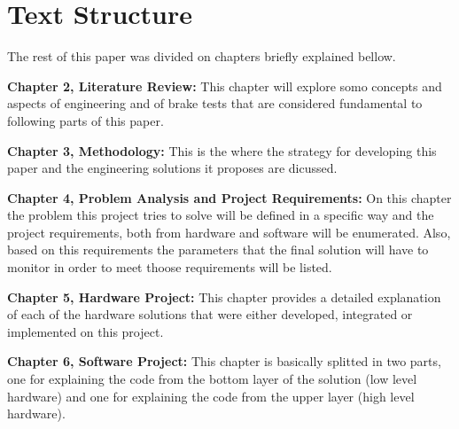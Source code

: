 	\section{Text Structure} 
	
	The rest of this paper was divided on chapters briefly explained bellow.
	
	\textbf{Chapter 2, Literature Review: } This chapter will explore somo concepts and aspects of engineering and of brake tests that are considered fundamental to following parts of this paper.
	\par
	
	\textbf{Chapter 3, Methodology: }
	This is the where the strategy for developing this paper and the engineering solutions it proposes are dicussed.
	\par
	
	\textbf{Chapter 4, Problem Analysis and Project Requirements: }
	On this chapter the problem this project tries to solve will be defined in a specific way and the project requirements, both from hardware and software will be enumerated. Also, based on this requirements the parameters that the final solution will have to monitor in order to meet thoose requirements will be listed.
	\par
	
	\textbf{Chapter 5, Hardware Project: }
	This chapter provides a detailed explanation of each of the hardware solutions that were either developed, integrated or implemented on this project.
	\par
	
	\textbf{Chapter 6, Software Project: }
	This chapter is basically splitted in two parts, one for explaining the code from the bottom layer of the solution (low level hardware) and one for explaining the code from the upper layer (high level hardware).
	\par